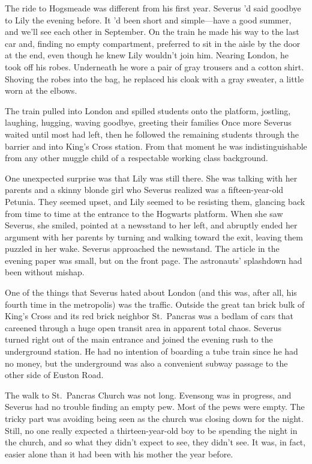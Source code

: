 The ride to Hogsmeade was different from his first year. Severus 'd said goodbye to Lily the evening before. It 'd been short and simple—have a good summer, and we'll see each other in September. On the train he made his way to the last car and, finding no empty compartment, preferred to sit in the aisle by the door at the end, even though he knew Lily wouldn't join him. Nearing London, he took off his robes. Underneath he wore a pair of gray trousers and a cotton shirt. Shoving the robes into the bag, he replaced his cloak with a gray sweater, a little worn at the elbows.

The train pulled into London and spilled students onto the platform, jostling, laughing, hugging, waving goodbye, greeting their families{\el} Once more Severus waited until most had left, then he followed the remaining students through the barrier and into King's Cross station. From that moment he was indistinguishable from any other muggle child of a respectable working class background.

One unexpected surprise was that Lily was still there. She was talking with her parents and a skinny blonde girl who Severus realized was a fifteen-year-old Petunia. They seemed upset, and Lily seemed to be resisting them, glancing back from time to time at the entrance to the Hogwarts platform. When she saw Severus, she smiled, pointed at a newsstand to her left, and abruptly ended her argument with her parents by turning and walking toward the exit, leaving them puzzled in her wake. Severus approached the newsstand. The article in the evening paper was small, but on the front page. The astronauts' splashdown had been without mishap.

One of the things that Severus hated about London (and this was, after all, his fourth time in the metropolis) was the traffic. Outside the great tan brick bulk of King's Cross and its red brick neighbor St.~Pancras was a bedlam of cars that careened through a huge open transit area in apparent total chaos. Severus turned right out of the main entrance and joined the evening rush to the underground station. He had no intention of boarding a tube train since he had no money, but the underground was also a convenient subway passage to the other side of Euston Road.

The walk to St.~Pancras Church was not long. Evensong was in progress, and Severus had no trouble finding an empty pew. Most of the pews were empty. The tricky part was avoiding being seen as the church was closing down for the night. Still, no one really expected a thirteen-year-old boy to be spending the night in the church, and so what they didn't expect to see, they didn't see. It was, in fact, easier alone than it had been with his mother the year before.

